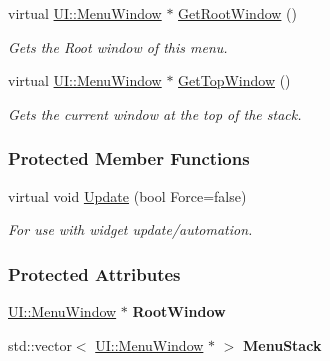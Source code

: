 \begin{DoxyCompactItemize}
virtual \hyperlink{classphys_1_1UI_1_1MenuWindow}{UI::MenuWindow} $\ast$ \hyperlink{classphys_1_1UI_1_1Menu_a9926f44b122c804b68034a759ea4a967}{GetRootWindow} ()
\begin{DoxyCompactList}\small\item\em Gets the Root window of this menu. \item\end{DoxyCompactList}\item 
virtual \hyperlink{classphys_1_1UI_1_1MenuWindow}{UI::MenuWindow} $\ast$ \hyperlink{classphys_1_1UI_1_1Menu_acf9a3bc3dd097093cce077cc60c14a6f}{GetTopWindow} ()
\begin{DoxyCompactList}\small\item\em Gets the current window at the top of the stack. \item\end{DoxyCompactList}\end{DoxyCompactItemize}
\subsubsection*{Protected Member Functions}
\begin{DoxyCompactItemize}
\item 
\hypertarget{classphys_1_1UI_1_1Menu_a8759b8656fdbbc0e1231a3f8d2ad4835}{
virtual void \hyperlink{classphys_1_1UI_1_1Menu_a8759b8656fdbbc0e1231a3f8d2ad4835}{Update} (bool Force=false)}
\label{classphys_1_1UI_1_1Menu_a8759b8656fdbbc0e1231a3f8d2ad4835}

\begin{DoxyCompactList}\small\item\em For use with widget update/automation. \item\end{DoxyCompactList}\end{DoxyCompactItemize}
\subsubsection*{Protected Attributes}
\begin{DoxyCompactItemize}
\item 
\hypertarget{classphys_1_1UI_1_1Menu_a02ca1c85ecb8cacf57c7fdad8ea16385}{
\hyperlink{classphys_1_1UI_1_1MenuWindow}{UI::MenuWindow} $\ast$ {\bfseries RootWindow}}
\label{classphys_1_1UI_1_1Menu_a02ca1c85ecb8cacf57c7fdad8ea16385}

\item 
\hypertarget{classphys_1_1UI_1_1Menu_a79081cb1d293f75fc69f20ed7e91dff6}{
std::vector$<$ \hyperlink{classphys_1_1UI_1_1MenuWindow}{UI::MenuWindow} $\ast$ $>$ {\bfseries MenuStack}}
\label{classphys_1_1UI_1_1Menu_a79081cb1d293f75fc69f20ed7e91dff6}

\end{DoxyCompactItemize}


